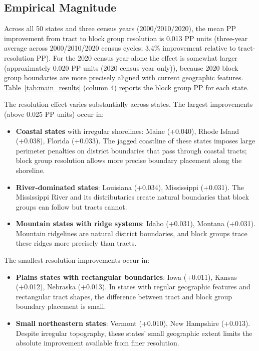 \subsection{Empirical Magnitude}

Across all 50 states and three census years (2000/2010/2020), the mean PP improvement from tract to block group resolution is 0.013 PP units (three-year average across 2000/2010/2020 census cycles; 3.4\% improvement relative to tract-resolution PP). For the 2020 census year alone the effect is somewhat larger (approximately 0.020 PP units (2020 census year only)), because 2020 block group boundaries are more precisely aligned with current geographic features. Table~\ref{tab:main_results} (column 4) reports the block group PP for each state.

The resolution effect varies substantially across states. The largest improvements (above 0.025 PP units) occur in:
\begin{itemize}
\item \textbf{Coastal states} with irregular shorelines: Maine (+0.040), Rhode Island (+0.038), Florida (+0.033). The jagged coastline of these states imposes large perimeter penalties on district boundaries that pass through coastal tracts; block group resolution allows more precise boundary placement along the shoreline.
\item \textbf{River-dominated states}: Louisiana (+0.034), Mississippi (+0.031). The Mississippi River and its distributaries create natural boundaries that block groups can follow but tracts cannot.
\item \textbf{Mountain states with ridge systems}: Idaho (+0.031), Montana (+0.031). Mountain ridgelines are natural district boundaries, and block groups trace these ridges more precisely than tracts.
\end{itemize}

The smallest resolution improvements occur in:
\begin{itemize}
\item \textbf{Plains states with rectangular boundaries}: Iowa (+0.011), Kansas (+0.012), Nebraska (+0.013). In states with regular geographic features and rectangular tract shapes, the difference between tract and block group boundary placement is small.
\item \textbf{Small northeastern states}: Vermont (+0.010), New Hampshire (+0.013). Despite irregular topography, these states' small geographic extent limits the absolute improvement available from finer resolution.
\end{itemize}

